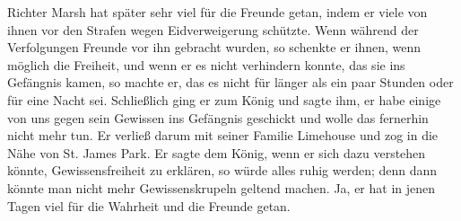 Richter Marsh hat später sehr viel für die Freunde getan,
indem er viele von ihnen vor den Strafen wegen Eidverweigerung
schützte. Wenn während der Verfolgungen Freunde vor ihn gebracht
wurden, so schenkte er ihnen, wenn möglich die Freiheit, und wenn 
er es nicht verhindern konnte, das sie ins Gefängnis kamen, so
machte er, das es nicht für länger als ein paar Stunden oder
für eine Nacht sei. Schließlich ging er zum König und sagte
ihm, er habe einige von uns gegen sein Gewissen ins Gefängnis
geschickt und wolle das fernerhin nicht mehr tun. Er verließ
darum mit seiner Familie Limehouse und zog in die Nähe von
St. James Park. Er sagte dem König, wenn er sich dazu 
verstehen könnte, Gewissensfreiheit zu erklären, so würde alles ruhig
werden; denn dann könnte man nicht mehr Gewissenskrupeln
geltend machen. Ja, er hat in jenen Tagen viel für die Wahrheit 
und die Freunde getan.

